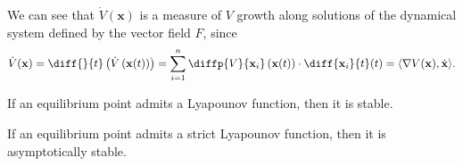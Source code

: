 We can see that $\dot{V} ( \mathbf{x} )$ is a measure of $V$ growth along solutions of the dynamical system
defined by the vector field $F$, since
$$\dot{V} ( \mathbf{x} ) = \diff{}{t} \left( \dot{V} \left( \mathbf{x} (t) \right) \right) =
\sum_{i=1}^n \diffp{V}{{\mathbf{x}_i}} \left( \mathbf{x} (t) \right) \cdot \diff{ \mathbf{x}_i }{t} (t) =
\langle \nabla V ( \mathbf{x} ) , \dot{ \mathbf{x} } \rangle.$$


\begin{teorema}
    If an equilibrium point admits a Lyapounov function, then it is stable.
    \label{teo:lyapounovFunc}
\end{teorema}

\begin{corollario}
    If an equilibrium point admits a strict Lyapounov function, then it is asymptotically stable.
\end{corollario}
